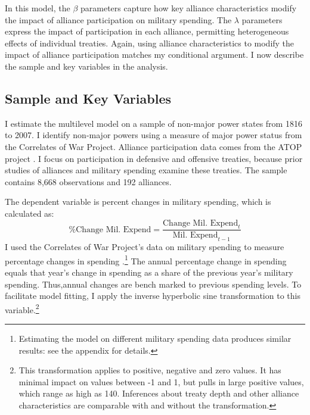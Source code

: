 \documentclass[12pt]{article}
\begin{document}
In this model, the $\beta$ parameters capture how key alliance characteristics modify the impact of alliance participation on military spending. 
The $\lambda$ parameters express the impact of participation in each alliance, permitting heterogeneous effects of individual treaties. 
Again, using alliance characteristics to modify the impact of alliance participation matches my conditional argument. 
I now describe the sample and key variables in the analysis.  



\subsection{Sample and Key Variables} 

I estimate the multilevel model on a sample of non-major power states from 1816 to 2007. 
I identify non-major powers using a measure of major power status from the Correlates of War Project. 
Alliance participation data comes from the ATOP project \citep{Leedsetal2002}.  
I focus on participation in defensive and offensive treaties, because prior studies of alliances and military spending examine these treaties. 
The sample contains 8,668 observations and 192 alliances. 


The dependent variable is percent changes in military spending, which is calculated as:
\begin{equation}
\mbox{\% Change Mil. Expend} = \frac{ \mbox{Change Mil. Expend}_t }{ \mbox{Mil. Expend}_{t-1} }
\end{equation} 
I used the Correlates of War Project's data on military spending to measure percentage changes in spending \citep{SingerCINC1988}.\footnote{Estimating the model on different military spending data produces similar results: see the appendix for details.} 
The annual percentage change in spending equals that year's change in spending as a share of the previous year's military spending.
Thus,annual changes are bench marked to previous spending levels. 
To facilitate model fitting, I apply the inverse hyperbolic sine transformation to this variable.\footnote{This transformation applies to positive, negative and zero values. It has minimal impact on values between -1 and 1, but pulls in large positive values, which range as high as 140. Inferences about treaty depth and other alliance characteristics are comparable with and without the transformation.}
\end{document}
